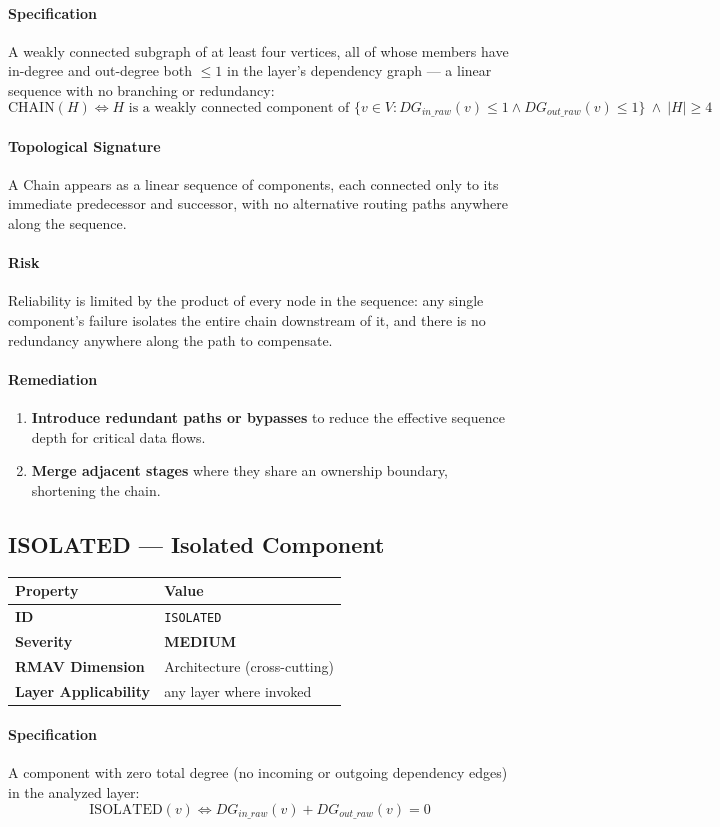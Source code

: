 \documentclass[11pt]{article}
\makeatletter
\newcommand{\MEDIUM}{\textcolor{yellow!50!black}{\textbf{MEDIUM}}}
\newcommand{\patternprop}[4]{%
  \begin{center}
  \begin{tabular}{@{}ll@{}}
  \toprule
  \textbf{Property} & \textbf{Value} \\
  \midrule
  \textbf{ID} & \texttt{#1} \\
  \textbf{Severity} & #2 \\
  \textbf{RMAV Dimension} & #3 \\
  \textbf{Layer Applicability} & #4 \\
  \bottomrule
  \end{tabular}
  \end{center}
}
\makeatother
\begin{document}
\paragraph{Specification}
A weakly connected subgraph of at least four vertices, all of whose members have in-degree and out-degree both $\le 1$ in the layer's dependency graph --- a linear sequence with no branching or redundancy:
\[
\mathrm{CHAIN}(H) \Leftrightarrow H \text{ is a weakly connected component of } \{v \in V : DG_{in\_raw}(v) \le 1 \land DG_{out\_raw}(v) \le 1\}\ \land\ |H| \ge 4
\]

\paragraph{Topological Signature}
A Chain appears as a linear sequence of components, each connected only to its immediate predecessor and successor, with no alternative routing paths anywhere along the sequence.

\paragraph{Risk}
Reliability is limited by the product of every node in the sequence: any single component's failure isolates the entire chain downstream of it, and there is no redundancy anywhere along the path to compensate.

\paragraph{Remediation}
\begin{enumerate}[leftmargin=*]
\item \textbf{Introduce redundant paths or bypasses} to reduce the effective sequence depth for critical data flows.
\item \textbf{Merge adjacent stages} where they share an ownership boundary, shortening the chain.
\end{enumerate}

\subsection{ISOLATED --- Isolated Component}
\patternprop{ISOLATED}{\MEDIUM}{Architecture (cross-cutting)}{any layer where invoked}

\paragraph{Specification}
A component with zero total degree (no incoming or outgoing dependency edges) in the analyzed layer:
\[
\mathrm{ISOLATED}(v) \Leftrightarrow DG_{in\_raw}(v) + DG_{out\_raw}(v) = 0
\]
\end{document}
